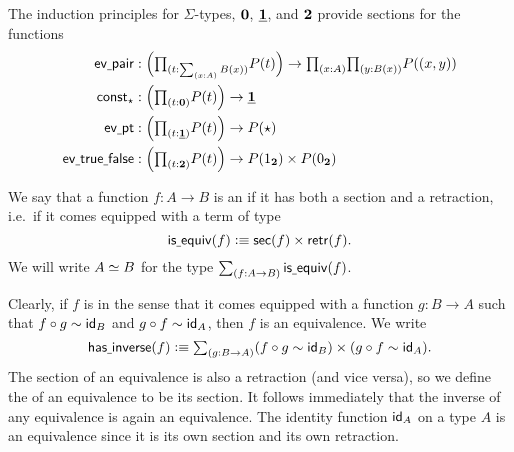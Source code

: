 \begin{eg}
The induction principles for $\Sigma$-types, $\emptyt$, $\unit$, and $\bool$ provide sections for the functions
\begin{align*}
\evpair & : \Big(\prd{t:\sm{x:A}B(x)}P(t)\Big)\to \prd{x:A}{y:B(x)}P((x,y)) \\
\const_\ttt & : \Big(\prd{t:\emptyt}P(t)\Big)\to \unit \\
\evpt & : \Big(\prd{t:\unit}P(t)\Big) \to P(\ttt) \\
\evtruefalse & : \Big(\prd{t:\bool}P(t)\Big) \to P(\btrue)\times P(\bfalse) \\
\end{align*}
\end{eg}

\begin{defn}
We say that a function $f:A\to B$ is an  if it has both a section and a retraction, i.e.~if it comes equipped with a term of type
\begin{equation*}
\isequiv(f)\defeq\sections(f)\times\retractions(f).
\end{equation*}
We will write $\eqv{A}{B}$ for the type $\sm{f:A\to B}\isequiv(f)$.
\end{defn}

Clearly, if $f$ is  in the sense that it comes equipped with a function $g:B\to A$ such that $f\circ g\htpy\idfunc[B]$ and $g\circ f\htpy\idfunc[A]$, then $f$ is an equivalence. We write
\begin{equation*}
\hasinverse(f)\defeq\sm{g:B\to A} (f\circ g\htpy \idfunc[B])\times (g\circ f\htpy\idfunc[A]).
\end{equation*}
The section of an equivalence is also a retraction (and vice versa), so we define the  of an equivalence to be its section. It follows immediately that the inverse of any equivalence is again an equivalence. The identity function $\idfunc[A]$ on a type $A$ is an equivalence since it is its own section and its own retraction.

